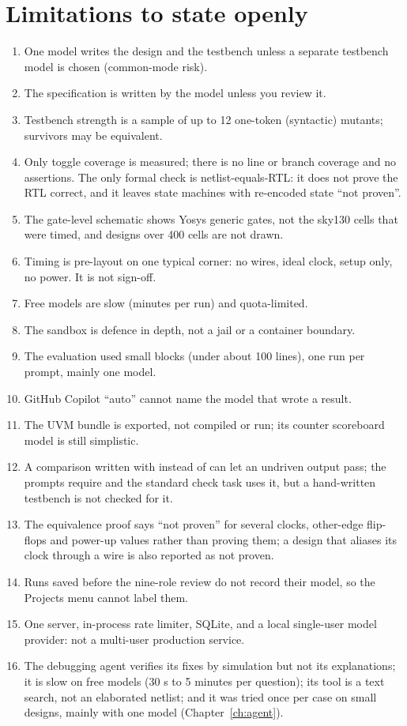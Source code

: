 \section{Limitations to state openly}

\begin{enumerate}
  \item One model writes the design and the testbench unless a separate testbench model is chosen (common-mode risk).
  \item The specification is written by the model unless you review it.
  \item Testbench strength is a sample of up to 12 one-token (syntactic) mutants; survivors may be equivalent.
  \item Only toggle coverage is measured; there is no line or branch coverage and no assertions. The only formal check is netlist-equals-RTL: it does not prove the RTL correct, and it leaves state machines with re-encoded state ``not proven''.
  \item The gate-level schematic shows Yosys generic gates, not the sky130 cells that were timed, and designs over 400 cells are not drawn.
  \item Timing is pre-layout on one typical corner: no wires, ideal clock, setup only, no power. It is not sign-off.
  \item Free models are slow (minutes per run) and quota-limited.
  \item The sandbox is defence in depth, not a jail or a container boundary.
  \item The evaluation used small blocks (under about 100 lines), one run per prompt, mainly one model.
  \item GitHub Copilot ``auto'' cannot name the model that wrote a result.
  \item The UVM bundle is exported, not compiled or run; its counter scoreboard model is still simplistic.
  \item A comparison written with \code{==} instead of \code{===} can let an undriven output pass; the prompts require \code{===} and the standard check task uses it, but a hand-written testbench is not checked for it.
  \item The equivalence proof says ``not proven'' for several clocks, other-edge flip-flops and power-up values rather than proving them; a design that aliases its clock through a wire is also reported as not proven.
  \item Runs saved before the nine-role review do not record their model, so the Projects menu cannot label them.
  \item One server, in-process rate limiter, SQLite, and a local single-user model provider: not a multi-user production service.
  \item The debugging agent verifies its fixes by simulation but not its explanations; it is slow on free models (30 s to 5 minutes per question); its  tool is a text search, not an elaborated netlist; and it was tried once per case on small designs, mainly with one model (Chapter~\ref{ch:agent}).
\end{enumerate}

